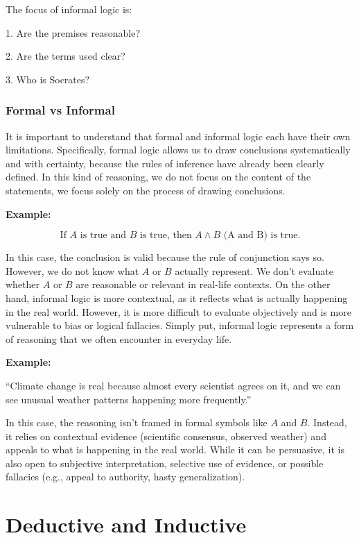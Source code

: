\documentclass[12pt,a4paper,openany]{article}
\begin{document}
The focus of informal logic is:

1. Are the premises reasonable?

2. Are the terms used clear?

3. Who is Socrates?

\subsubsection{Formal vs Informal} 

It is important to understand that formal and informal logic each have their own limitations. Specifically, formal logic allows us to draw conclusions systematically and with certainty, because the rules of inference have already been clearly defined. In this kind of reasoning, we do not focus on the content of the statements, we focus solely on the process of drawing conclusions.

\textbf{Example:}

$$ \text{If } A \text{ is true and } B \text{ is true, then } A \land B \text{ (A and B) is true.}$$

In this case, the conclusion is valid because the rule of conjunction says so. However, we do not know what $ A $  or $ B $ actually represent. We don’t evaluate whether $ A $ or $ B $ are reasonable or relevant in real-life contexts. On the other hand, informal logic is more contextual, as it reflects what is actually happening in the real world. However, it is more difficult to evaluate objectively and is more vulnerable to bias or logical fallacies. Simply put, informal logic represents a form of reasoning that we often encounter in everyday life.

\textbf{Example:}

“Climate change is real because almost every scientist agrees on it, and we can see unusual weather patterns happening more frequently.”

In this case, the reasoning isn’t framed in formal symbols like $A$ and $B$. Instead, it relies on contextual evidence (scientific consensus, observed weather) and appeals to what is happening in the real world. While it can be persuasive, it is also open to subjective interpretation, selective use of evidence, or possible fallacies (e.g., appeal to authority, hasty generalization).


\section{Deductive and Inductive}
\end{document}
